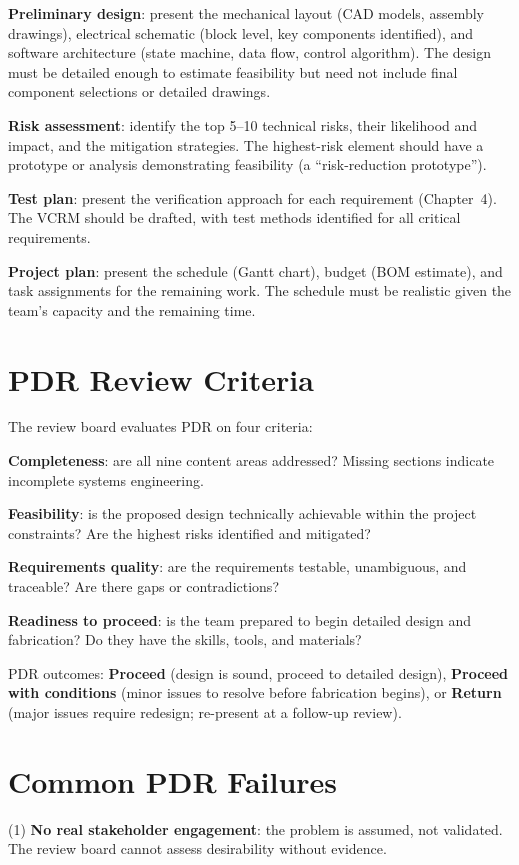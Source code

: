 \documentclass[11pt,letterpaper,twoside,openany]{book}
\begin{document}
\textbf{Preliminary design}: present the mechanical layout (CAD models, assembly drawings), electrical schematic (block level, key components identified), and software architecture (state machine, data flow, control algorithm). The design must be detailed enough to estimate feasibility but need not include final component selections or detailed drawings.

\textbf{Risk assessment}: identify the top 5--10 technical risks, their likelihood and impact, and the mitigation strategies. The highest-risk element should have a prototype or analysis demonstrating feasibility (a ``risk-reduction prototype'').

\textbf{Test plan}: present the verification approach for each requirement (Chapter~4). The VCRM should be drafted, with test methods identified for all critical requirements.

\textbf{Project plan}: present the schedule (Gantt chart), budget (BOM estimate), and task assignments for the remaining work. The schedule must be realistic given the team's capacity and the remaining time.

\section{PDR Review Criteria}
The review board evaluates PDR on four criteria:

\textbf{Completeness}: are all nine content areas addressed? Missing sections indicate incomplete systems engineering.

\textbf{Feasibility}: is the proposed design technically achievable within the project constraints? Are the highest risks identified and mitigated?

\textbf{Requirements quality}: are the requirements testable, unambiguous, and traceable? Are there gaps or contradictions?

\textbf{Readiness to proceed}: is the team prepared to begin detailed design and fabrication? Do they have the skills, tools, and materials?

PDR outcomes: \textbf{Proceed} (design is sound, proceed to detailed design), \textbf{Proceed with conditions} (minor issues to resolve before fabrication begins), or \textbf{Return} (major issues require redesign; re-present at a follow-up review).

\section{Common PDR Failures}
(1) \textbf{No real stakeholder engagement}: the problem is assumed, not validated. The review board cannot assess desirability without evidence.
\end{document}
